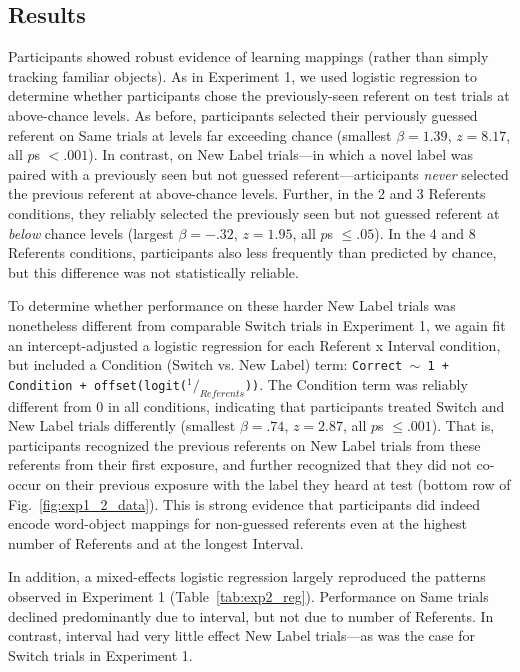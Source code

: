 \documentclass[man,floatsintext]{apa6}
\begin{document}
\subsection{Results}

Participants showed robust evidence of learning mappings (rather than simply tracking familiar objects). As in Experiment 1, we used logistic regression to determine whether participants chose the previously-seen referent on test trials at above-chance levels. As before, participants selected their perviously guessed referent on Same trials at levels far exceeding chance (smallest $\beta =  1.39$, $z=8.17$, all $p$s $< .001$). In contrast, on New Label trials---in which a novel label was paired with a previously seen but not guessed referent---articipants \emph{never} selected the previous referent at above-chance levels. Further, in the 2 and 3 Referents conditions, they reliably selected the previously seen but not guessed referent at \emph{below} chance levels (largest $\beta =  -.32$, $z=1.95$, all $p$s $\leq .05$). In the 4 and 8 Referents conditions, participants also less frequently than predicted by chance, but this difference was not statistically reliable.

To determine whether performance on these harder New Label trials was nonetheless different from comparable Switch trials in Experiment 1, we again fit an intercept-adjusted a logistic regression for each Referent x Interval condition, but included a Condition (Switch vs. New Label) term: \small{\tt{Correct $\sim$ 1 + Condition + offset(logit($^1/_{Referents}$))}}. The Condition term was reliably different from 0 in all conditions, indicating that participants treated Switch and New Label trials differently (smallest $\beta =  .74$, $z=2.87$, all $p$s $\leq .001$). That is, participants recognized the previous referents on New Label trials from these referents from their first exposure, and further recognized that they did not co-occur on their previous exposure with the label they heard at test (bottom row of Fig.~\ref{fig:exp1_2_data}). This is strong evidence that participants did indeed encode word-object mappings for non-guessed referents even at the highest number of Referents and at the longest Interval.

In addition, a mixed-effects logistic regression largely reproduced the patterns observed in Experiment 1 (Table~\ref{tab:exp2_reg}). Performance on Same trials declined predominantly due to interval, but not due to number of Referents. In contrast, interval had very little effect New Label trials---as was the case for Switch trials in Experiment 1.
\end{document}

